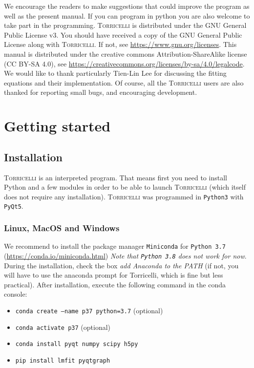 \documentclass[oldfontcommands,openany,oneside]{memoir}
\begin{document}
We encourage the readers to make suggestions that could improve the program as well as the present manual. If you can program in python you are also welcome to take part in the programming. \textsc{Torricelli} is distributed under the GNU General Public License v3. You should have received a copy of the GNU General Public License along with \textsc{Torricelli}.  If not, see \url{https://www.gnu.org/licenses}. This manual is distributed under the creative commons Attribution-ShareAlike license (CC BY-SA 4.0), see \url{https://creativecommons.org/licenses/by-sa/4.0/legalcode}.\\

We would like to thank particularly Tien-Lin Lee for discussing the fitting equations and their implementation. Of course, all the \textsc{Torricelli} users are also thanked for reporting small bugs, and encouraging development. \newpage

\tableofcontents
\mainmatter

\chapter{Getting started}
\section{Installation} %
\textsc{Torricelli} is an interpreted program. That means first you need to install Python and a few modules in order to be able to launch \textsc{Torricelli} (which itself does not require any installation). \textsc{Torricelli} was programmed in \texttt{Python3} with \texttt{PyQt5}. 

\subsection{Linux, MacOS and Windows}
We recommend to install the package manager \verb+Miniconda+  for \verb+Python 3.7+ (\href{https://conda.io/miniconda.html}{https://conda.io/miniconda.html}) \emph{Note that \texttt{Python 3.8} does not work for now}. During the installation, check the box \emph{add Anaconda to the PATH} (if not, you will have to use the anaconda prompt for Torricelli, which is fine but less practical). After installation, execute the following command in the conda console:
\begin{itemize}
\item \texttt{conda create --name p37 python=3.7} (optional)
\item \texttt{conda activate p37} (optional)
\item \texttt{conda install pyqt numpy scipy h5py}
\item \texttt{pip install lmfit pyqtgraph}
\end{itemize}
\end{document}

